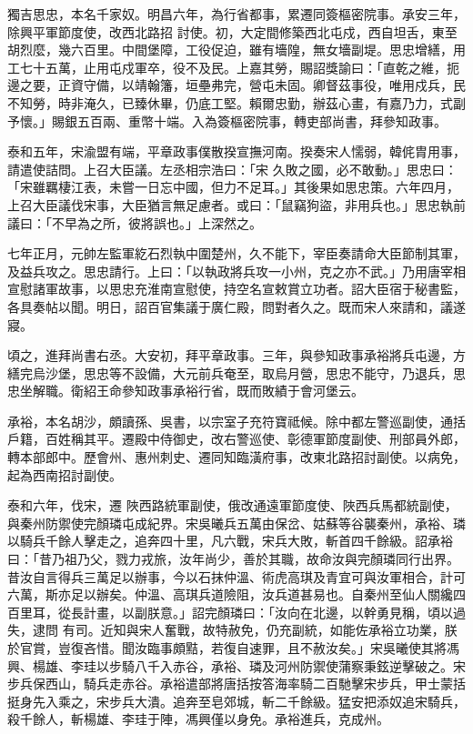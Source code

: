 \begin{pinyinscope}
 獨吉思忠，本名千家奴。明昌六年，為行省都事，累遷同簽樞密院事。承安三年，除興平軍節度使，改西北路招
 討使。初，大定間修築西北屯戍，西自坦舌，東至胡烈麼，幾六百里。中間堡障，工役促迫，雖有墻隍，無女墻副堤。思忠增繕，用工七十五萬，止用屯戍軍卒，役不及民。上嘉其勞，賜詔獎諭曰：「直乾之維，扼邊之要，正資守備，以靖翰籓，垣壘弗完，營屯未固。卿督茲事役，唯用戍兵，民不知勞，時非淹久，已臻休畢，仍底工堅。賴爾忠勤，辦茲心畫，有嘉乃力，式副予懷。」賜銀五百兩、重幣十端。入為簽樞密院事，轉吏部尚書，拜參知政事。



 泰和五年，宋渝盟有端，平章政事僕散揆宣撫河南。揆奏宋人懦弱，韓侂胄用事，請遣使詰問。上召大臣議。左丞相宗浩曰：「宋
 久敗之國，必不敢動。」思忠曰：「宋雖羈棲江表，未嘗一日忘中國，但力不足耳。」其後果如思忠策。六年四月，上召大臣議伐宋事，大臣猶言無足慮者。或曰：「鼠竊狗盜，非用兵也。」思忠執前議曰：「不早為之所，彼將誤也。」上深然之。



 七年正月，元帥左監軍紇石烈執中圍楚州，久不能下，宰臣奏請命大臣節制其軍，及益兵攻之。思忠請行。上曰：「以執政將兵攻一小州，克之亦不武。」乃用唐宰相宣慰諸軍故事，以思忠充淮南宣慰使，持空名宣敕賞立功者。詔大臣宿于秘書監，各具奏帖以聞。明日，詔百官集議于廣仁殿，問對者久之。既而宋人來請和，議遂
 寢。



 頃之，進拜尚書右丞。大安初，拜平章政事。三年，與參知政事承裕將兵屯邊，方繕完烏沙堡，思忠等不設備，大元前兵奄至，取烏月營，思忠不能守，乃退兵，思忠坐解職。衛紹王命參知政事承裕行省，既而敗績于會河堡云。



 承裕，本名胡沙，頗讀孫、吳書，以宗室子充符寶祗候。除中都左警巡副使，通括戶籍，百姓稱其平。遷殿中侍御史，改右警巡使、彰德軍節度副使、刑部員外郎，轉本部郎中。歷會州、惠州刺史、遷同知臨潢府事，改東北路招討副使。以病免，起為西南招討副使。



 泰和六年，伐宋，遷
 陜西路統軍副使，俄改通遠軍節度使、陜西兵馬都統副使，與秦州防禦使完顏璘屯成紀界。宋吳曦兵五萬由保岔、姑蘇等谷襲秦州，承裕、璘以騎兵千餘人擊走之，追奔四十里，凡六戰，宋兵大敗，斬首四千餘級。詔承裕曰：「昔乃祖乃父，戮力戎旅，汝年尚少，善於其職，故命汝與完顏璘同行出界。昔汝自言得兵三萬足以辦事，今以石抹仲溫、術虎高琪及青宜可與汝軍相合，計可六萬，斯亦足以辦矣。仲溫、高琪兵道險阻，汝兵道甚易也。自秦州至仙人關纔四百里耳，從長計畫，以副朕意。」詔完顏璘曰：「汝向在北邊，以幹勇見稱，頃以過失，逮問
 有司。近知與宋人奮戰，故特赦免，仍充副統，如能佐承裕立功業，朕於官賞，豈復吝惜。聞汝臨事頗黠，若復自速罪，且不赦汝矣。」宋吳曦使其將馮興、楊雄、李珪以步騎八千入赤谷，承裕、璘及河州防禦使蒲察秉鉉逆擊破之。宋步兵保西山，騎兵走赤谷。承裕遣部將唐括按答海率騎二百馳擊宋步兵，甲士蒙括挺身先入乘之，宋步兵大潰。追奔至皂郊城，斬二千餘級。猛安把添奴追宋騎兵，殺千餘人，斬楊雄、李珪于陣，馮興僅以身免。承裕進兵，克成州。




\end{pinyinscope}
